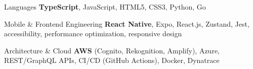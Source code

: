 
\begin{cvskills}

  \cvskill
  {Languages}
  {\textbf{TypeScript}, JavaScript, HTML5, CSS3, Python, Go}

  \cvskill
  {Mobile \& Frontend Engineering}
  {\textbf{React Native}, Expo, React.js, Zustand, Jest, accessibility, performance optimization, responsive design}

  \cvskill
  {Architecture \& Cloud}
  {\textbf{AWS} (Cognito, Rekognition, Amplify), Azure, REST/GraphQL APIs, CI/CD (GitHub Actions), Docker, Dynatrace}

\end{cvskills}
